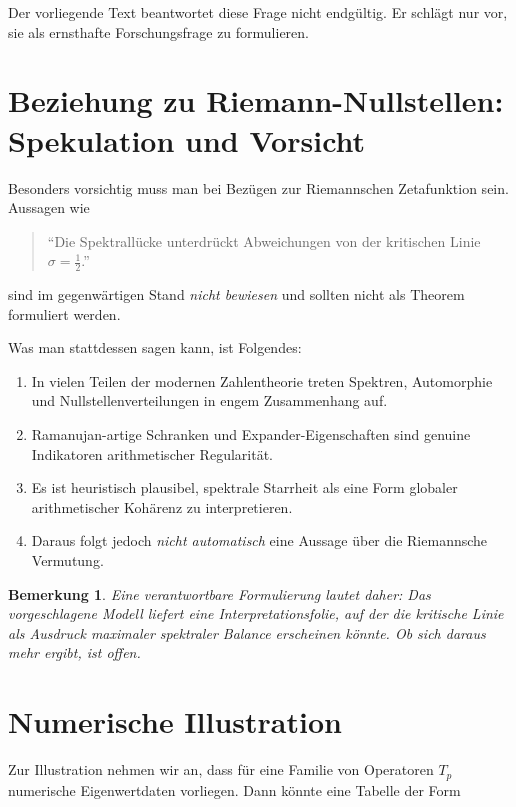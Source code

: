 \documentclass[12pt,a4paper]{article}
\newtheorem{remark}[theorem]{Bemerkung}
\begin{document}
	Der vorliegende Text beantwortet diese Frage nicht endgültig. Er schlägt nur vor, sie als ernsthafte Forschungsfrage zu formulieren.
	
	\section{Beziehung zu Riemann-Nullstellen: Spekulation und Vorsicht}
	
	Besonders vorsichtig muss man bei Bezügen zur Riemannschen Zetafunktion sein. Aussagen wie
	\begin{quote}
		``Die Spektrallücke unterdrückt Abweichungen von der kritischen Linie $\sigma=\tfrac12$.'' 
	\end{quote}
	sind im gegenwärtigen Stand \emph{nicht bewiesen} und sollten nicht als Theorem formuliert werden.
	
	Was man stattdessen sagen kann, ist Folgendes:
	
	\begin{enumerate}[label=\arabic*.]
		\item In vielen Teilen der modernen Zahlentheorie treten Spektren, Automorphie und Nullstellenverteilungen in engem Zusammenhang auf.
		\item Ramanujan-artige Schranken und Expander-Eigenschaften sind genuine Indikatoren arithmetischer Regularität.
		\item Es ist heuristisch plausibel, spektrale Starrheit als eine Form globaler arithmetischer Kohärenz zu interpretieren.
		\item Daraus folgt jedoch \emph{nicht automatisch} eine Aussage über die Riemannsche Vermutung.
	\end{enumerate}
	
	\begin{remark}
		Eine verantwortbare Formulierung lautet daher: Das vorgeschlagene Modell liefert \emph{eine Interpretationsfolie}, auf der die kritische Linie als Ausdruck maximaler spektraler Balance erscheinen könnte. Ob sich daraus mehr ergibt, ist offen.
	\end{remark}
	
	\section{Numerische Illustration}
	
	Zur Illustration nehmen wir an, dass für eine Familie von Operatoren $T_p$ numerische Eigenwertdaten vorliegen. Dann könnte eine Tabelle der Form
	
\end{document}
